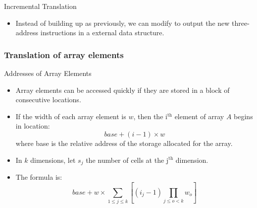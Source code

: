\begin{bibunit}[apalike]
\begin{frame}{Incremental Translation}
	\begin{itemize}
	\item Instead of building up  as previously, we can modify  to output the new three-address instructions in a external data structure.
	\end{itemize}
	\vfill
	\begin{footnotesize}
	\begin{sdd}
	\end{sdd}
	\end{footnotesize}
\end{frame}

\subsubsection{Translation of array elements}

\tableofcontentslide[sections={3-6},sectionstyle={show/shaded},subsectionstyle={show/shaded/hide},subsubsectionstyle={show/shaded/hide/hide}]

\begin{frame}{Addresses of Array Elements}
	\begin{itemize}
	\item Array elements can be accessed quickly if they are stored in a block of consecutive locations.
	\item If the width of each array element is $w$, then the i$^{\text{th}}$ element of array $A$ begins in location:
		\[ base + ( i - 1 ) \times w \]
		where base is the relative address of the storage allocated for the array.
	\item In $k$ dimensions, let $s_j$ the number of cells at the j$^{\text{th}}$ dimension.
	\item The formula is:
		\[ base + w \times \sum_{1 \le j \le k} \left[ \left( i_j -1 \right) \prod_{j \le o < k} w_o \right] \]
	\end{itemize}
\end{frame}


\end{bibunit}
